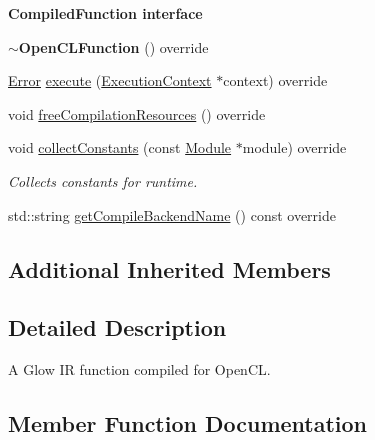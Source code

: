 \begin{Indent}\textbf{ Compiled\+Function interface}\par
\begin{DoxyCompactItemize}
\item 
\mbox{\label{classglow_1_1_open_c_l_function_a86c778de3d9aee98a6f045a362da4173}} 
{\bfseries $\sim$\+Open\+C\+L\+Function} () override
\item 
\hyperlink{namespaceglow_afdb176c3a672ef66db0ecfc19a8d39bf}{Error} \hyperlink{classglow_1_1_open_c_l_function_aa203e8d612943a37fcd5c44285a6c6eb}{execute} (\hyperlink{classglow_1_1_execution_context}{Execution\+Context} $\ast$context) override
\item 
void \hyperlink{classglow_1_1_open_c_l_function_aeaa9afb43d01cedc7c89c7451e5cec5d}{free\+Compilation\+Resources} () override
\item 
\mbox{\label{classglow_1_1_open_c_l_function_a26a83ba0ff7dcb348e99ac8f30ad2740}} 
void \hyperlink{classglow_1_1_open_c_l_function_a26a83ba0ff7dcb348e99ac8f30ad2740}{collect\+Constants} (const \hyperlink{classglow_1_1_module}{Module} $\ast$module) override
\begin{DoxyCompactList}\small\item\em Collects constants for runtime. \end{DoxyCompactList}\item 
std\+::string \hyperlink{classglow_1_1_open_c_l_function_ad676ba76a33a2e8802caa82052b569c9}{get\+Compile\+Backend\+Name} () const override
\end{DoxyCompactItemize}
\end{Indent}
\subsection*{Additional Inherited Members}


\subsection{Detailed Description}
A Glow IR function compiled for Open\+CL. 

\subsection{Member Function Documentation}
\mbox{\label{classglow_1_1_open_c_l_function_aa203e8d612943a37fcd5c44285a6c6eb}} 
